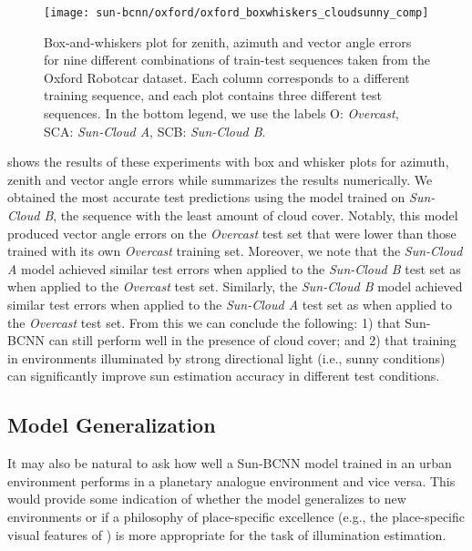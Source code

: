 \begin{figure}
    \centering
    \texttt{[image: sun-bcnn/oxford/oxford\_boxwhiskers\_cloudsunny\_comp]}
    \caption{Box-and-whiskers plot for zenith, azimuth and vector angle errors for nine different combinations of train-test sequences taken from the Oxford Robotcar dataset.  Each column corresponds to a different training sequence, and each plot contains three different test sequences. In the bottom legend, we use the labels O: \emph{Overcast}, SCA: \emph{Sun-Cloud A}, SCB: \emph{Sun-Cloud B}.}
    \label{fig:oxford-boxwhiskers}
\end{figure}

 shows the results of these experiments with box and whisker plots for azimuth, zenith and vector angle errors while  summarizes the results numerically. 
We obtained the most accurate test predictions using the model trained on \emph{Sun-Cloud B}, the sequence with the least amount of cloud cover. 
Notably, this model produced vector angle errors on the  \emph{Overcast} test set that were lower than those trained with its own \emph{Overcast} training set. 
Moreover, we note that the \emph{Sun-Cloud A} model achieved similar test errors when applied to the \emph{Sun-Cloud B} test set as when applied to the \emph{Overcast} test set.
Similarly, the \emph{Sun-Cloud B} model achieved similar test errors when applied to the \emph{Sun-Cloud A} test set as when applied to the \emph{Overcast} test set.
From this we can conclude the following: 1) that Sun-BCNN can still perform well in the presence of cloud cover; and 2) that training in environments illuminated by strong directional light (i.e., sunny conditions) can significantly improve sun estimation accuracy in different test conditions.


\subsection{Model Generalization}
It may also be natural to ask how well a Sun-BCNN model trained in an urban environment performs in a planetary analogue environment and vice versa.
This would provide some indication of whether the model generalizes to new environments or if a philosophy of place-specific excellence (e.g., the place-specific visual features of \cite{mcmanus2014}) is more appropriate for the task of illumination estimation.

